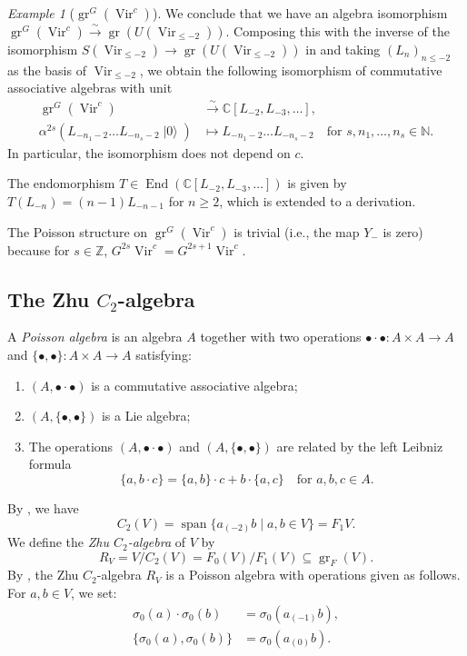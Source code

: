 \documentclass[a4paper, 12pt, reqno]{amsart}
\theoremstyle{remark}
\newtheorem{example}[theorem]{Example}
\numberwithin{equation}{subsection}
\DeclareMathOperator{\Vir}{Vir}
\DeclareMathOperator{\gr}{gr}
\DeclareMathOperator{\End}{End}
\DeclareMathOperator{\vspan}{span}
\DeclareMathOperator{\vac}{|0\rangle}
\begin{document}
\begin{example}[$\gr^G(\Vir^c)$]
  We conclude that we have an algebra isomorphism $\gr^G(\Vir^c) \xrightarrow{\sim} \gr(U(\Vir_{\le -2}))$.
  Composing this with the inverse of the isomorphism $S(\Vir_{\le -2}) \to \gr(U(\Vir_{\le -2}))$ in  and taking $(L_n)_{n \le -2}$ as the basis of $\Vir_{\le -2}$, we obtain the following isomorphism of commutative associative algebras with unit
  \begin{align*}
  \gr^G(\Vir^c) &\xrightarrow{\sim} \mathbb{C}[L_{-2}, L_{-3}, \dots], \\
  \alpha^{2s}(L_{-n_1 - 2}\dots L_{-n_s - 2}\vac) &\mapsto L_{-n_1 - 2}\dots L_{-n_s - 2} \quad \text{for }s, n_1, \dots, n_s \in \mathbb{N}.
  \end{align*}
  In particular, the isomorphism does not depend on $c$.

  The endomorphism $T \in \End(\mathbb{C}[L_{-2}, L_{-3}, \dots])$ is given by $T(L_{-n}) = (n - 1)L_{-n - 1}$ for $n \ge 2$, which is extended to a derivation.

  The Poisson structure on $\gr^G(\Vir^c)$ is trivial (i.e., the map $Y_-$ is zero) because for $s \in \mathbb{Z}$, $G^{2s}\Vir^c = G^{2s + 1}\Vir^c$.
\end{example}

\subsection{The Zhu $C_2$-algebra}
\label{sec:zhu-c_2-algebra}

A \emph{Poisson algebra} is an algebra $A$ together with two operations $\bullet \cdot \bullet: A \times A \to A$ and $\{\bullet, \bullet\}: A \times A \to A$ satisfying:
\begin{enumerate}
\item $(A, \bullet \cdot \bullet)$ is a commutative associative algebra;
\item $(A, \{\bullet, \bullet\})$ is a Lie algebra;
\item The operations $(A, \bullet \cdot \bullet)$ and $(A, \{\bullet, \bullet\})$ are related by the left Leibniz formula
  \begin{equation*}
    \{a, b\cdot c\} = \{a, b\}\cdot c + b\cdot\{a, c\} \quad \text{for }a, b, c \in A.
  \end{equation*}
\end{enumerate}

By , we have
\begin{equation*}
  C_2(V) = \vspan\{a_{(-2)}b \mid a, b \in V\} = F_1V.
\end{equation*}
We define the \emph{Zhu $C_2$-algebra} of $V$ by
\begin{equation*}
  R_V = V/C_2(V) = F_0(V)/F_1(V) \subseteq \gr_F(V).
\end{equation*}
By \cite[Proposition 3.7]{li_abelianizing_2005}, the Zhu $C_2$-algebra $R_V$ is a Poisson algebra with operations given as follows.
For $a, b \in V$, we set:
\begin{align*}
  \sigma_0(a)\cdot\sigma_0(b) &= \sigma_0(a_{(-1)}b), \\
  \{\sigma_0(a), \sigma_0(b)\} &= \sigma_0(a_{(0)}b).
\end{align*}
\end{document}
